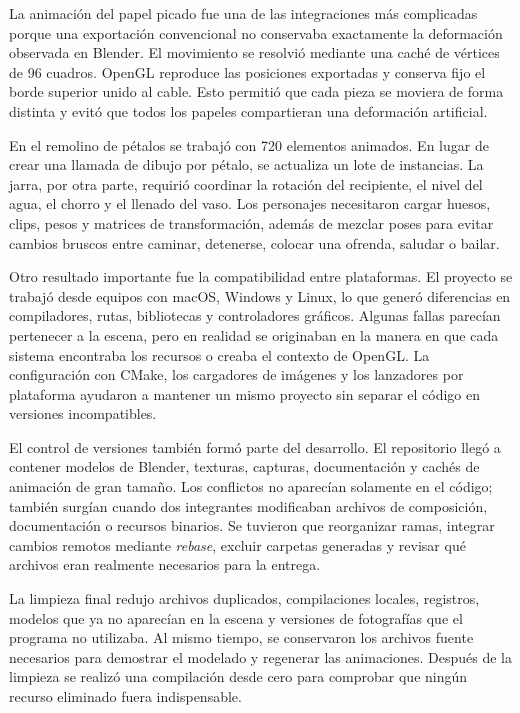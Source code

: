 \documentclass[letter,12pt]{article}
\begin{document}
La animación del papel picado fue una de las integraciones más complicadas porque una exportación convencional no conservaba exactamente la deformación observada en Blender. El movimiento se resolvió mediante una caché de vértices de 96 cuadros. OpenGL reproduce las posiciones exportadas y conserva fijo el borde superior unido al cable. Esto permitió que cada pieza se moviera de forma distinta y evitó que todos los papeles compartieran una deformación artificial.

En el remolino de pétalos se trabajó con 720 elementos animados. En lugar de crear una llamada de dibujo por pétalo, se actualiza un lote de instancias. La jarra, por otra parte, requirió coordinar la rotación del recipiente, el nivel del agua, el chorro y el llenado del vaso. Los personajes necesitaron cargar huesos, clips, pesos y matrices de transformación, además de mezclar poses para evitar cambios bruscos entre caminar, detenerse, colocar una ofrenda, saludar o bailar.

Otro resultado importante fue la compatibilidad entre plataformas. El proyecto se trabajó desde equipos con macOS, Windows y Linux, lo que generó diferencias en compiladores, rutas, bibliotecas y controladores gráficos. Algunas fallas parecían pertenecer a la escena, pero en realidad se originaban en la manera en que cada sistema encontraba los recursos o creaba el contexto de OpenGL. La configuración con CMake, los cargadores de imágenes y los lanzadores por plataforma ayudaron a mantener un mismo proyecto sin separar el código en versiones incompatibles.

El control de versiones también formó parte del desarrollo. El repositorio llegó a contener modelos de Blender, texturas, capturas, documentación y cachés de animación de gran tamaño. Los conflictos no aparecían solamente en el código; también surgían cuando dos integrantes modificaban archivos de composición, documentación o recursos binarios. Se tuvieron que reorganizar ramas, integrar cambios remotos mediante \textit{rebase}, excluir carpetas generadas y revisar qué archivos eran realmente necesarios para la entrega.

La limpieza final redujo archivos duplicados, compilaciones locales, registros, modelos que ya no aparecían en la escena y versiones de fotografías que el programa no utilizaba. Al mismo tiempo, se conservaron los archivos fuente necesarios para demostrar el modelado y regenerar las animaciones. Después de la limpieza se realizó una compilación desde cero para comprobar que ningún recurso eliminado fuera indispensable.
\end{document}
